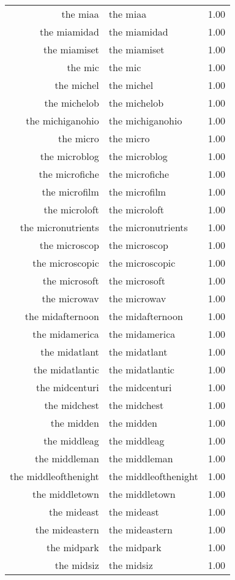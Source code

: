 \begin{table}[ht]
\begin{tabular}{rlr}
  the miaa & the miaa & 1.00 \\ 
  the miamidad & the miamidad & 1.00 \\ 
  the miamiset & the miamiset & 1.00 \\ 
  the mic & the mic & 1.00 \\ 
  the michel & the michel & 1.00 \\ 
  the michelob & the michelob & 1.00 \\ 
  the michiganohio & the michiganohio & 1.00 \\ 
  the micro & the micro & 1.00 \\ 
  the microblog & the microblog & 1.00 \\ 
  the microfiche & the microfiche & 1.00 \\ 
  the microfilm & the microfilm & 1.00 \\ 
  the microloft & the microloft & 1.00 \\ 
  the micronutrients & the micronutrients & 1.00 \\ 
  the microscop & the microscop & 1.00 \\ 
  the microscopic & the microscopic & 1.00 \\ 
  the microsoft & the microsoft & 1.00 \\ 
  the microwav & the microwav & 1.00 \\ 
  the midafternoon & the midafternoon & 1.00 \\ 
  the midamerica & the midamerica & 1.00 \\ 
  the midatlant & the midatlant & 1.00 \\ 
  the midatlantic & the midatlantic & 1.00 \\ 
  the midcenturi & the midcenturi & 1.00 \\ 
  the midchest & the midchest & 1.00 \\ 
  the midden & the midden & 1.00 \\ 
  the middleag & the middleag & 1.00 \\ 
  the middleman & the middleman & 1.00 \\ 
  the middleofthenight & the middleofthenight & 1.00 \\ 
  the middletown & the middletown & 1.00 \\ 
  the mideast & the mideast & 1.00 \\ 
  the mideastern & the mideastern & 1.00 \\ 
  the midpark & the midpark & 1.00 \\ 
  the midsiz & the midsiz & 1.00 \\ 

\end{tabular}
\end{table}
